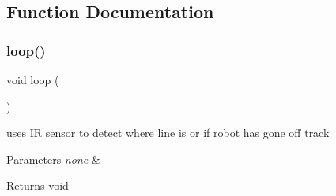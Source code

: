 \subsection{Function Documentation}
\mbox{\label{IRModule__Line_8ino_afe461d27b9c48d5921c00d521181f12f}} 
\subsubsection{\texorpdfstring{loop()}{loop()}}
{\footnotesize\ttfamily void loop (\begin{DoxyParamCaption}{ }\end{DoxyParamCaption})}



uses IR sensor to detect where line is or if robot has gone off track 


\begin{DoxyParams}{Parameters}
{\em none} & \\
\hline
\end{DoxyParams}
\begin{DoxyReturn}{Returns}
void 
\end{DoxyReturn}
